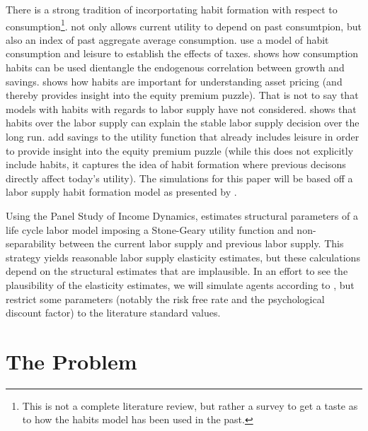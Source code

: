 \documentclass[ProjectMMD]{subfiles}
\begin{document}
There is a strong tradition of incorportating habit formation with respect to consumption\footnote{This is not a complete literature review, but rather a survey to get a taste as to how the habits model has been used in the past.}. \cite{abel1990asset} not only allows current utility to depend on past consumtpion, but also an index of past aggregate average consumption. \cite{koehne2015optimal} use a model of habit consumption and leisure to establish the effects of taxes. \cite{carroll2000saving} shows how consumption habits can be used dientangle the endogenous correlation between growth and savings. \cite{campbell1999force} shows how habits are important for understanding asset pricing (and thereby provides insight into the equity premium puzzle). That is not to say that models with habits with regards to labor supply have not considered. \cite{struck2014habit} shows that habits over the labor supply can explain the stable labor supply decision over the long run. \cite{dreyer2020saving} add savings to the utility function that already includes leisure in order to provide insight into the equity premium puzzle (while this does not explicitly include habits, it captures the idea of habit formation where previous decisons directly affect today's utility). The simulations for this paper will be based off a labor supply habit formation model as presented by \cite{bover1991relaxing}.

Using the Panel Study of Income Dynamics, \cite{bover1991relaxing} estimates structural parameters of a life cycle labor model imposing a Stone-Geary utility function and non-separability between the current labor supply and previous labor supply. This strategy yields reasonable labor supply elasticity estimates, but these calculations depend on the structural estimates that are implausible. In an effort to see the plausibility of the elasticity estimates, we will simulate agents according to \cite{bover1991relaxing}, but restrict some parameters (notably the risk free rate and the psychological discount factor) to the literature standard values.


\section{The Problem}
\end{document}
